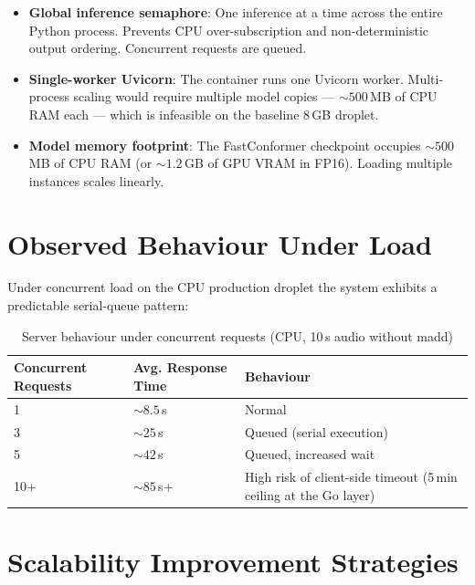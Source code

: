\begin{warnbox}[title=Concurrency Limitations]
\begin{itemize}
  \item \textbf{Global inference semaphore}: One inference at a time across the entire Python process. Prevents CPU over-subscription and non-deterministic output ordering. Concurrent requests are queued.
  \item \textbf{Single-worker Uvicorn}: The container runs one Uvicorn worker. Multi-process scaling would require multiple model copies --- ${\sim}500$\,MB of CPU RAM each --- which is infeasible on the baseline 8\,GB droplet.
  \item \textbf{Model memory footprint}: The FastConformer checkpoint occupies ${\sim}500$\,MB of CPU RAM (or ${\sim}1.2$\,GB of GPU VRAM in FP16). Loading multiple instances scales linearly.
\end{itemize}
\end{warnbox}

\section{Observed Behaviour Under Load}

Under concurrent load on the CPU production droplet the system exhibits a predictable serial-queue pattern:

\begin{table}[H]
  \centering
  \caption{Server behaviour under concurrent requests (CPU, 10\,s audio without madd)}
  \label{tab:scale_load}
  \renewcommand{\arraystretch}{1.3}
  \small
  \begin{tabular}{p{2.6cm}p{2.8cm}p{7.5cm}}
    \toprule
    \textbf{Concurrent Requests} & \textbf{Avg. Response Time} & \textbf{Behaviour} \\
    \midrule
    1   & ${\sim}8.5$\,s   & Normal \\
    3   & ${\sim}25$\,s    & Queued (serial execution) \\
    5   & ${\sim}42$\,s    & Queued, increased wait \\
    10+ & ${\sim}85$\,s+   & High risk of client-side timeout (5\,min ceiling at the Go layer) \\
    \bottomrule
  \end{tabular}
\end{table}

\section{Scalability Improvement Strategies}

